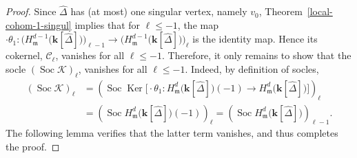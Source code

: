 \documentclass[ALCO,ThmDefs,Unicode,epreuves]{cedram}
\DeclareMathOperator{\Soc}{Soc}
\DeclareMathOperator\Ker{Ker}
\newcommand{\complet}[1]{\hat{#1}}
\newcommand{\field}{\mathbf{k}}
\renewcommand{\C}{{\mathcal C}}
\newcommand{\K}{{\mathcal K}}
\newcommand{\mideal}{\ensuremath{\mathfrak{m}}}
\begin{document}
\begin{proof}
Since $\complet{\Delta}$ has (at most) one singular vertex, namely $v_0$, Theorem~\ref{local-cohom-1-singul} implies that for $\ell\leq -1$, the map $\cdot\theta_1: \big(H^{d-1}_\mideal\big(\field[\complet{\Delta}]\big)\big)_{\ell-1}\to \big(H^{d-1}_\mideal\big(\field[\complet{\Delta}]\big)\big)_{\ell}$ is the identity map. Hence its cokernel, $\C_\ell$, vanishes for all $\ell\leq -1$. Therefore, it only remains to show that the socle $(\Soc \K)_\ell$, vanishes for all $\ell\leq -1$. Indeed, by definition of socles,
\begin{align*}
(\Soc \K)_\ell &=\left(\Soc \Ker \big[\cdot \theta_1: H^{d}_\mideal\big(\field[\complet{\Delta}]\big)(-1) \longrightarrow H^{d}_\mideal\big(\field[\complet{\Delta}]\big)\big]\right)_\ell \\
&= \left(\Soc H^{d}_\mideal\big(\field[\complet{\Delta}]\big)(-1)\right)_\ell=\left(\Soc H^{d}_\mideal\big(\field[\complet{\Delta}]\big)\right)_{\ell-1}.
\end{align*}
The following lemma verifies that the latter term vanishes, and thus completes the proof. 
\end{proof}
\end{document}
